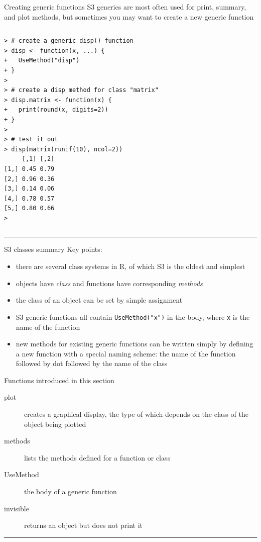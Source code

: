 \documentclass[table,smaller]{beamer}
\begin{document}
\begin{frame}[fragile,label=sec-7-5]{Creating generic functions}
 S3 generics are most often used for print, summary, and plot methods, but sometimes you may want to create a new generic function

\vspace{-.5em}
\begin{columns}
\begin{block}{}
\begin{verbatim}
> # create a generic disp() function
> disp <- function(x, ...) {
+   UseMethod("disp")
+ }
> 
> # create a disp method for class "matrix"
> disp.matrix <- function(x) {
+   print(round(x, digits=2))
+ }
> 
> # test it out
> disp(matrix(runif(10), ncol=2))  
     [,1] [,2]
[1,] 0.45 0.79
[2,] 0.96 0.36
[3,] 0.14 0.06
[4,] 0.78 0.57
[5,] 0.80 0.66
>
\end{verbatim}
\end{block}
\end{columns}
\vspace{.5em}

\rule{\linewidth}{0.5pt}
\end{frame}
\begin{frame}[fragile,label=sec-7-6]{S3 classes summary}
 Key points:
\begin{itemize}
\item there are several class systems in R, of which S3 is the oldest and simplest
\item objects have \emph{class} and functions have corresponding \emph{methods}
\item the class of an object can be set by simple assignment
\item S3 generic functions all contain \verb~UseMethod("x")~ in the body, where \verb~x~ is the name of the function
\item new methods for existing generic functions can be written simply by defining a new function with a special naming scheme: the name of the function followed by dot followed by the name of the class
\end{itemize}

Functions introduced in this section  
\begin{description}
\item[{plot}] creates a graphical display, the type of which depends on the class of the object being plotted
\item[{methods}] lists the methods defined for a function or class
\item[{UseMethod}] the body of a generic function
\item[{invisible}] returns an object but does not print it
\end{description}


\rule{\linewidth}{0.5pt}
\end{frame}
\end{document}
